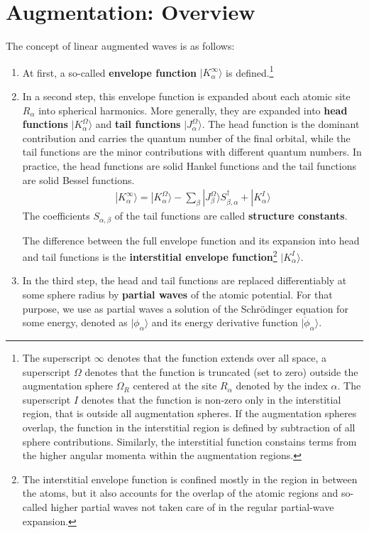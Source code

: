 \documentclass[11pt,a4paper]{report}
\begin{document}
\section{Augmentation: Overview}
The concept of linear augmented waves\cite{andersen75_prb12_3060} is
as follows:
\begin{enumerate}
\item At first, a so-called \textbf{envelope function} $|K^\infty_\alpha\rangle$ is defined.\footnote{The
  superscript $\infty$ denotes that the function extends over all
  space, a superscript $\Omega$ denotes that the function is truncated
  (set to zero) outside the augmentation sphere $\Omega_{R}$ centered
  at the site $R_\alpha$ denoted by the index $\alpha$. The
  superscript $I$ denotes that the function is non-zero only in the
  interstitial region, that is outside all augmentation spheres. If
  the augmentation spheres overlap, the function in the interstitial
  region is defined by subtraction of all sphere
  contributions. Similarly, the interstitial function constains terms
  from the higher angular momenta within the augmentation regions.}
%
\item In a second step, this envelope function is expanded about each
  atomic site $R_\alpha$ into spherical harmonics.  More generally,
  they are expanded into \textbf{head functions}
  $|K^\Omega_\alpha\rangle$ and \textbf{tail functions} $|J^\Omega_\alpha\rangle$. The head function is the
  dominant contribution and carries the quantum number of the final
  orbital, while the tail functions are the minor contributions with
  different quantum numbers. In practice, the head functions are solid
  Hankel functions and the tail functions are solid Bessel functions.
\begin{eqnarray}
|K_{\alpha}^\infty\rangle=|K^\Omega_{\alpha}\rangle
-\sum_{\beta}|J^\Omega_{\beta}\rangle S^\dagger_{\beta,\alpha}
+|K^I_{\alpha}\rangle
\label{eq:multicenterexpandenvelopefunction1}
\end{eqnarray}
   The coefficients $S_{\alpha,\beta}$ of the tail functions are
   called \textbf{structure constants}.

  The difference between the full envelope function and its expansion
  into head and tail functions is the \textbf{interstitial envelope
    function}\footnote{The
    interstitial envelope function is confined mostly in the region in
    between the atoms, but it also accounts for the overlap of the
    atomic regions and so-called higher partial waves not taken care of
    in the regular partial-wave expansion.}  $|K^I_\alpha\rangle$.
%
\item In the third step, the head and tail functions are replaced
  differentiably at some sphere radius by \textbf{partial
    waves} of the atomic potential. For that
  purpose, we use as partial waves a solution of the Schr\"odinger
  equation for some energy, denoted as $|\phi_{\alpha}\rangle$ and its
  energy derivative function $|\dot{\phi}_\alpha\rangle$.


\end{enumerate}
\end{document}
